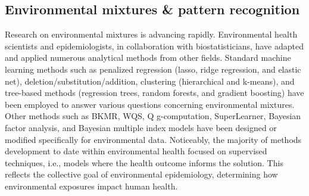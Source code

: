 \subsection{Environmental mixtures \& pattern recognition}
\label{sec:mixtures}
Research on environmental mixtures is advancing rapidly. Environmental health scientists and epidemiologists, in collaboration with biostatisticians, have adapted and applied numerous analytical methods from other fields. Standard machine learning methods such as penalized regression (lasso, ridge regression, and elastic net), deletion/substitution/addition, clustering (hierarchical and k-means), and tree-based methods (regression trees, random forests, and gradient boosting) have been employed to answer various questions concerning environmental mixtures. Other methods such as BKMR, WQS, Q g-computation, SuperLearner, Bayesian factor analysis, and Bayesian multiple index models have been designed or modified specifically for environmental data. Noticeably, the majority of methods development to date within environmental health focused on supervised techniques, i.e., models where the health outcome informs the solution. This reflects the collective goal of environmental epidemiology, determining how environmental exposures impact human health.






